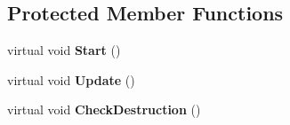 \subsection*{Protected Member Functions}
\begin{DoxyCompactItemize}
\item 
\mbox{\label{class_building_af6265930a8190d2119a20823e14c51c9}} 
virtual void {\bfseries Start} ()
\item 
\mbox{\label{class_building_aa64dc20cfb819092291546497fe988e2}} 
virtual void {\bfseries Update} ()
\item 
\mbox{\label{class_building_a268c2b42157075ee90ea9b8ec5fc1a06}} 
virtual void {\bfseries Check\+Destruction} ()
\end{DoxyCompactItemize}
